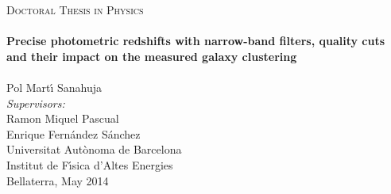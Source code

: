 \begin{titlepage}
\begin{center}

\textsc{\Large Doctoral Thesis in Physics}\\[1.5cm] %

\noindent\makebox[\linewidth]{\rule{\textwidth}{1pt}} \\[0.2cm]
{\huge \bfseries 
Precise photometric redshifts with narrow-band filters, quality cuts and their impact on the measured galaxy clustering}\\[0.2cm] %
\noindent\makebox[\linewidth]{\rule{\textwidth}{1pt}} \\[1.5cm]

\LARGE Pol Mart\'{\i} Sanahuja \\[5.0cm]

{\Large \emph{Supervisors:}\\ Ramon Miquel Pascual\\ Enrique Fern\'andez S\'anchez}\\[2cm]
 
{\Large Universitat Aut\`onoma de Barcelona}\\[0.2cm]
{\large Institut de F\'{\i}sica d'Altes Energies}\\[0.2cm] %
 
{\large Bellaterra, May 2014}\\[4cm] %
 
\vfill
\end{center}

\end{titlepage}

\clearpage{\pagestyle{empty}\cleardoublepage}
